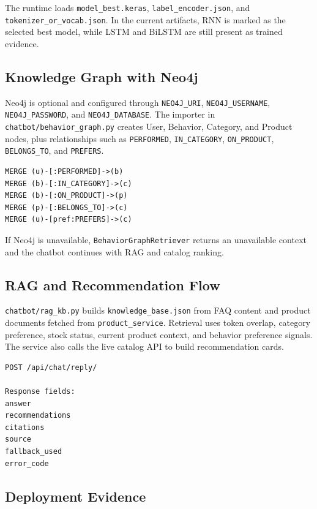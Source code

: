 \documentclass[12pt,a4paper]{article}
\newcommand{\codepath}[1]{{\small\texttt{#1}}}
\begin{document}
The runtime loads \codepath{model\_best.keras}, \codepath{label\_encoder.json}, and \codepath{tokenizer\_or\_vocab.json}. In the current artifacts, RNN is marked as the selected best model, while LSTM and BiLSTM are still present as trained evidence.

\subsection{Knowledge Graph with Neo4j}

Neo4j is optional and configured through \codepath{NEO4J\_URI}, \codepath{NEO4J\_USERNAME}, \codepath{NEO4J\_PASSWORD}, and \codepath{NEO4J\_DATABASE}. The importer in \codepath{chatbot/behavior\_graph.py} creates User, Behavior, Category, and Product nodes, plus relationships such as \codepath{PERFORMED}, \codepath{IN\_CATEGORY}, \codepath{ON\_PRODUCT}, \codepath{BELONGS\_TO}, and \codepath{PREFERS}.

\begin{lstlisting}[caption={Neo4j graph import relationship excerpt.}]
MERGE (u)-[:PERFORMED]->(b)
MERGE (b)-[:IN_CATEGORY]->(c)
MERGE (b)-[:ON_PRODUCT]->(p)
MERGE (p)-[:BELONGS_TO]->(c)
MERGE (u)-[pref:PREFERS]->(c)
\end{lstlisting}

If Neo4j is unavailable, \codepath{BehaviorGraphRetriever} returns an unavailable context and the chatbot continues with RAG and catalog ranking.

\subsection{RAG and Recommendation Flow}

\codepath{chatbot/rag\_kb.py} builds \codepath{knowledge\_base.json} from FAQ content and product documents fetched from \codepath{product\_service}. Retrieval uses token overlap, category preference, stock status, current product context, and behavior preference signals. The service also calls the live catalog API to build recommendation cards.

\begin{lstlisting}[caption={Chatbot API response contract.}]
POST /api/chat/reply/

Response fields:
answer
recommendations
citations
source
fallback_used
error_code
\end{lstlisting}

\subsection{Deployment Evidence}
\end{document}
